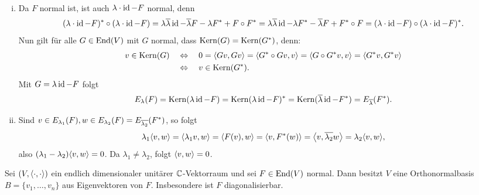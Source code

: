 \begin{beweis}
	\mbox{} \\[-.9cm]
	\begin{enumerate}[(i)]
		\item Da $F$ normal ist, ist auch $\lambda \cdot \operatorname{id} -F$ normal, denn
		\[
			(\lambda \cdot \operatorname{id} - F)^* \circ (\lambda \cdot \operatorname{id} - F) = \lambda \overline{\lambda} \operatorname{id} - \overline{\lambda} F - \lambda F^* + F \circ F^* = \lambda \overline{\lambda} \operatorname{id} - \lambda F^* - \overline{\lambda} F + F^* \circ F = (\lambda \cdot \operatorname{id} - F) \circ (\lambda \cdot \operatorname{id} - F)^*.
		\]
		Nun gilt für alle $G \in \operatorname{End}(V)$ mit $G$ normal, dass $\operatorname{Kern}(G) = \operatorname{Kern}(G^*)$, denn:
		\begin{align*}
			v \in \operatorname{Kern}(G) \quad &\Leftrightarrow \quad 0 = \left\langle Gv,Gv\right\rangle = \left\langle G^* \circ Gv,v\right\rangle = \left\langle G \circ G^*v,v\right\rangle = \left\langle G^*v,G^*v\right\rangle \\
			&\Leftrightarrow \quad v \in \operatorname{Kern}(G^*).
		\end{align*} 
		Mit $G = \lambda \operatorname{id} - F$ folgt
		\[
			E_\lambda(F) = \operatorname{Kern}(\lambda \operatorname{id} - F) = \operatorname{Kern}(\lambda \operatorname{id} - F)^* = \operatorname{Kern}(\overline{\lambda} \operatorname{id} - F^*) = E_{\overline{\lambda}}(F^*).
		\]
		\item Sind $v \in E_{\lambda_1}(F), w \in E_{\lambda_2}(F) = E_{\overline{\lambda_2}}(F^*)$, so folgt
		\[
			\lambda_1 \sk{v,w} = \sk{\lambda_1v,w} = \sk{F(v),w} = \sk{v,F^*(w)} = \sk{v,\ol{\lambda_2} w} = \lambda_2 \sk{v,w},
		\]
		also $(\lambda_1 - \lambda_2)\sk{v,w} = 0$.
		Da $\lambda_1 \neq \lambda_2$, folgt $\left\langle v,w\right\rangle = 0$. \qedhere
	\end{enumerate}
\end{beweis}

\begin{satz}
	\label{satz:7.3}
	Sei $(V,\left\langle\cdot,\cdot\right\rangle)$ ein endlich dimensionaler unitärer $\mathbb{C}$-Vektorraum und sei $F \in \operatorname{End}(V)$ normal.
	Dann besitzt $V$ eine Orthonormalbasis $B = \{v_1,\dots,v_n\}$ aus Eigenvektoren von $F$.
	Insbesondere ist $F$ diagonalisierbar.
\end{satz}

